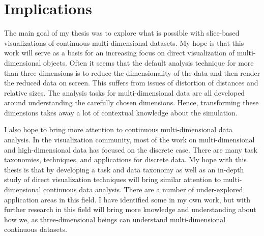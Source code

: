 
\section{Implications}

The main goal of my thesis was to explore what is possible with slice-based
visualizations of continuous multi-dimensional datasets. My hope is that this
work will serve as a basis for an increasing focus on direct visualization of
multi-dimensional objects. Often it seems that the default analysis technique
for more than three dimensions is to reduce
the dimensionality of the
data and then render the reduced data on screen. This suffers from issues of
distortion of distances and relative sizes. The analysis tasks for
multi-dimensional data are all developed around understanding the carefully
chosen dimensions. Hence, transforming these dimensions takes away a lot of
contextual knowledge about the simulation. 

I also hope to bring more attention to continuous multi-dimensional data analysis.
In the visualization community, most of the work on multi-dimensional and high-dimensional
data has focused on the discrete case. There are many task taxonomies, techniques,
and applications for discrete data. My hope with this thesis is that by developing
a task and data taxonomy as well as an in-depth study of direct visualization
techniques will bring similar attention to multi-dimensional continuous data
analysis. There are a number of under-explored application areas in this
field. I have identified some in my own work, but with further research in this
field will bring more knowledge and understanding about how we, as three-dimensional
beings can understand multi-dimensional continuous datasets.




